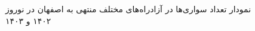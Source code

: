 \documentclass[a4paper, 12pt]{article}
\begin{document}
\begin{figure}[htbp]
    \caption{نمودار تعداد سواری‌ها در آزادراه‌های مختلف منتهی به اصفهان در نوروز ۱۴۰۲ و ۱۴۰۳}
\end{figure}
\end{document}
